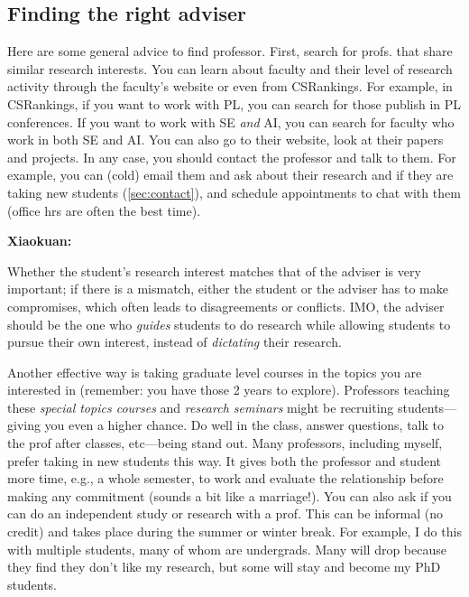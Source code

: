\documentclass[oneside,11pt]{memoir}
\newenvironment{commentbox}[1][]{
  \small
  \begin{mybox}
    {\small \textbf{#1}}
  }{
  \end{mybox}
}
\begin{document}
\subsection{Finding the right adviser}

Here are some general advice to find professor.  First, search for profs. that share similar research interests. You can learn about faculty and their level of research activity through the faculty's website or even from CSRankings.  For example, in CSRankings, if you want to work with PL, you can search for those publish in PL conferences.  If you want to work with SE \emph{and} AI, you can search for faculty who work in both SE and AI.   You can also go to their website, look at their papers and projects.  In any case, you should contact the professor and talk to them. For example, you can (cold) email them and ask about their research and if they are taking new students (\autoref{sec:contact}), and schedule appointments to chat with them (office hrs are often the best time).

\begin{commentbox}[Xiaokuan:]
  Whether the student's research interest matches that of the adviser is very important;
  if there is a mismatch,
  either the student or the adviser has to make compromises,
  which often leads to disagreements or conflicts.
  IMO, the adviser should be the one who \emph{guides}  students to do research while allowing students to pursue their own interest,
  instead of \emph{dictating} their research.
\end{commentbox}


Another effective way is taking graduate level courses in the topics you are interested in (remember: you have those 2 years to explore).  Professors teaching these \emph{special topics courses} and \emph{research seminars} might be recruiting students---giving you even a higher chance. Do well in the class, answer questions, talk to the prof after classes, etc---being stand out.  Many professors, including myself, prefer taking in new students this way.  It gives both the professor and student more time, e.g., a whole semester, to work and evaluate the relationship before making any commitment (sounds a bit like a marriage!).
You can also ask if you can do an independent study or research with a prof. This can be informal (no credit) and takes place during the summer or winter break.  For example, I do this with multiple students, many of whom are undergrads. Many will drop because they find they don't like my research, but some will stay and become my PhD students.
\end{document}
